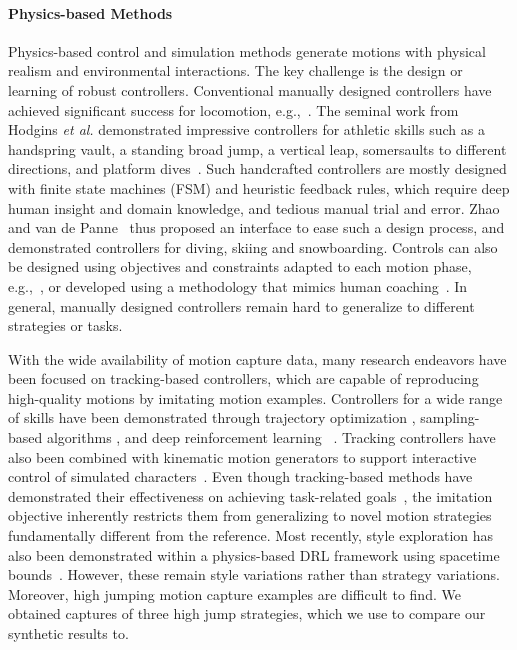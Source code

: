 \paragraph{Physics-based Methods}
Physics-based control and simulation methods generate motions with physical realism and environmental interactions. The key challenge is the design or learning of robust controllers. Conventional manually designed controllers have achieved significant success for locomotion, e.g.,~\cite{Yin07,wang2009optimizing,Coros10,wang2012optimizing,geijtenbeek2013flexible,lee2014locomotion,felis2016synthesis,jain2009optimization}. The seminal work from Hodgins \textit{et al.} demonstrated impressive controllers for athletic skills such as a handspring vault, a standing broad jump, a vertical leap, somersaults to different directions, and platform dives~\cite{Hodgins95,Wooten98}. Such handcrafted controllers are mostly designed with finite state machines (FSM) and heuristic feedback rules, which require deep human insight and domain knowledge, and tedious manual trial and error. Zhao and van de Panne~ thus proposed an interface to ease such a design process, and demonstrated controllers for diving, skiing and snowboarding. Controls can also be designed using objectives and constraints adapted to each motion phase, e.g.,~\cite{jain2009optimization,deLasa2010},
or developed using a methodology that mimics human coaching~\cite{ha2014-human-coach}. In general, manually designed controllers remain hard to generalize to different strategies or tasks. 

With the wide availability of motion capture data, many research endeavors have been focused on tracking-based controllers, which are capable of reproducing high-quality motions by imitating motion examples. Controllers for a wide range of skills have been demonstrated through trajectory optimization \cite{sok2007simulating,da2008interactive,muico2009contact,lee2010data-driven-biped,ye2010optimal,lee2014locomotion}, sampling-based algorithms \cite{Liu:2010:Samcon,Liu:2015:Samcon2,Liu16}, and deep reinforcement learning ~\cite{Peng2017deepLoco,Peng:2018:DeepMimic,Peng:2018:SFV,ma2021spacetime,Liu18,Lee19}.
Tracking controllers have also been combined with kinematic motion generators to support interactive control of simulated characters~\cite{Bergamin:2019:DReCon,Park:2019:LPS,won2020scalable}. Even though tracking-based methods have demonstrated their effectiveness on achieving task-related goals~\cite{Peng:2018:DeepMimic}, the imitation objective inherently restricts them from generalizing to novel motion strategies fundamentally different from the reference. Most recently, style exploration has also been demonstrated within a physics-based DRL framework using spacetime bounds~\cite{ma2021spacetime}. However, these remain style variations rather than strategy variations. Moreover, high jumping motion capture examples are difficult to find. We obtained captures of three high jump strategies, which we use to compare our synthetic results to.

